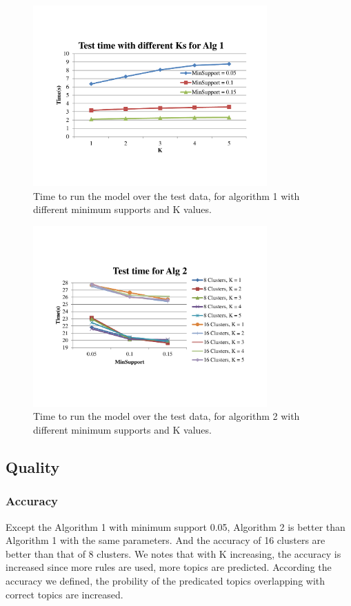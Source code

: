 \begin{figure}
\centering
\includegraphics[width=0.8\textwidth]{TestingTime1}
\caption{\footnotesize Time to run the model over the test data, for algorithm
1 with different minimum supports and K values. }
\label{Fig:TestTime1}
\end{figure}

\begin{figure}
\centering
\includegraphics[width=0.8\textwidth]{TestingTime2}
\caption{\footnotesize Time to run the model over the test data, for algorithm
2 with different minimum supports and K values. }
\label{Fig:TestTime2}
\end{figure}

\subsection{Quality}
\subsubsection{Accuracy}
Except the Algorithm 1 with minimum support 0.05, Algorithm 2 is better than Algorithm 1 with the same parameters. And the accuracy of 16 clusters are better than that of 8 clusters. We notes that with K increasing, the accuracy is increased since more rules are used, more topics are predicted. According the accuracy we defined, the probility of the predicated topics overlapping with correct topics are increased.   

